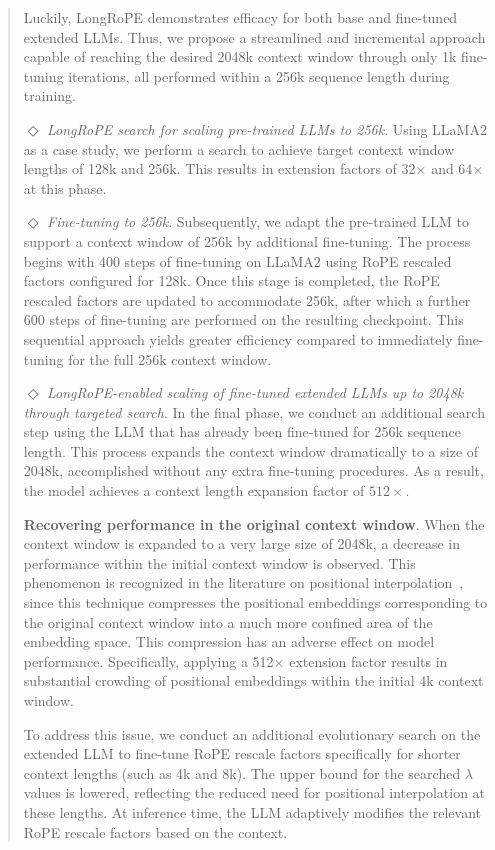 \begin{abstract}
Luckily, LongRoPE demonstrates efficacy for both base and fine-tuned extended LLMs. Thus, we propose a streamlined and incremental approach capable of reaching the desired 2048k context window through only 1k fine-tuning iterations, all performed within a 256k sequence length during training.

$\Diamond$ \textit{LongRoPE search for scaling pre-trained LLMs to 256k}. Using LLaMA2 as a case study, we perform a search to achieve target context window lengths of 128k and 256k. This results in extension factors of 32$\times$ and 64$\times$ at this phase.

$\Diamond$ \textit{Fine-tuning to 256k}. Subsequently, we adapt the pre-trained LLM to support a context window of 256k by additional fine-tuning. The process begins with 400 steps of fine-tuning on LLaMA2 using RoPE rescaled factors configured for 128k. Once this stage is completed, the RoPE rescaled factors are updated to accommodate 256k, after which a further 600 steps of fine-tuning are performed on the resulting checkpoint. This sequential approach yields greater efficiency compared to immediately fine-tuning for the full 256k context window.

$\Diamond$ \textit{LongRoPE-enabled scaling of fine-tuned extended LLMs up to 2048k through targeted search}. In the final phase, we conduct an additional search step using the LLM that has already been fine-tuned for 256k sequence length. This process expands the context window dramatically to a size of 2048k, accomplished without any extra fine-tuning procedures. As a result, the model achieves a context length expansion factor of $512\times$.

\textbf{Recovering performance in the original context window}. When the context window is expanded to a very large size of 2048k, a decrease in performance within the initial context window is observed. This phenomenon is recognized in the literature on positional interpolation~\cite{pi}, since this technique compresses the positional embeddings corresponding to the original context window into a much more confined area of the embedding space. This compression has an adverse effect on model performance. Specifically, applying a 512$\times$ extension factor results in substantial crowding of positional embeddings within the initial 4k context window.

To address this issue, we conduct an additional evolutionary search on the extended LLM to fine-tune RoPE rescale factors specifically for shorter context lengths (such as 4k and 8k). The upper bound for the searched $\lambda$ values is lowered, reflecting the reduced need for positional interpolation at these lengths. At inference time, the LLM adaptively modifies the relevant RoPE rescale factors based on the context.


\end{abstract}
